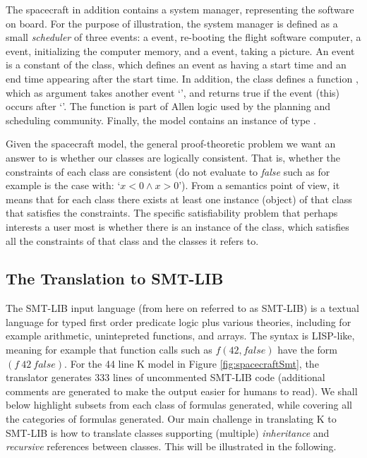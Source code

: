 The spacecraft in addition contains a system manager, representing the
software on board. For the purpose of illustration, the system manager
is defined as a small {\em scheduler} of three events: a 
event, re-booting the flight software computer, a 
event, initializing the computer memory, and a 
event, taking a picture. An event is a constant of the 
class, which defines an event as having a start time and an end time
appearing after the start time. In addition, the  class
defines a function , which as argument takes another event
`', and returns true if the event (this) occurs after
`'.  The  function is part of Allen logic
\cite{allen-logic-84} used by the planning and scheduling community.
%
Finally, the model contains an instance  of type
.

Given the spacecraft model, the general proof-theoretic problem we
want an answer to is whether our classes are logically
consistent. That is, whether the constraints of each class are
consistent (do not evaluate to {\em false} such as for example is the
case with: `$x < 0 \wedge x > 0$'). From a semantics point of view, it
means that for each class there exists at least one instance (object)
of that class that satisfies the constraints.  The specific
satisfiability problem that perhaps interests a user most is whether
there is an instance  of the  class,
which satisfies all the constraints of that class and the classes it
refers to.

\subsection{The Translation to SMT-LIB}

The SMT-LIB input language (from here on referred to as SMT-LIB) is a
textual language for typed first order predicate logic plus various
theories, including for example arithmetic, unintepreted functions,
and arrays. The syntax is LISP-like, meaning for example that function
calls such as $f(42,false)$ have the form $(f\ 42\ false)$. For the 44
line K model in Figure \ref{fig:spacecraftSmt}, the translator
generates 333 lines of uncommented SMT-LIB code (additional comments
are generated to make the output easier for humans to read). We shall
below highlight subsets from each class of formulas generated, while
covering all the categories of formulas generated. Our main challenge
in translating K to SMT-LIB is how to translate classes 
supporting (multiple) {\em inheritance} and {\em recursive} references
between classes. This will be illustrated in the following.

